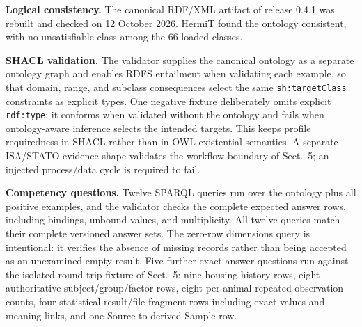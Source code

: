\textbf{Logical consistency.} The canonical RDF/XML artifact of release 0.4.1 was rebuilt and checked on 12 October 2026. HermiT \cite{hermit2014} found the ontology consistent, with no unsatisfiable class among the 66 loaded classes.

\textbf{SHACL validation.} The validator supplies the canonical ontology as a separate ontology graph and enables RDFS entailment when validating each example, so that domain, range, and subclass consequences select the same \nolinkurl{sh:targetClass} constraints as explicit types.  One negative fixture deliberately omits explicit \nolinkurl{rdf:type}: it conforms when validated without the ontology and fails when ontology-aware inference selects the intended targets. This keeps profile requiredness in SHACL rather than in OWL existential semantics. A separate ISA/STATO evidence shape validates the workflow boundary of Sect.~5; an injected process/data cycle is required to fail. 

\textbf{Competency questions.} Twelve SPARQL queries run over the ontology plus all positive examples, and the validator checks the complete expected answer rows, including bindings, unbound values, and multiplicity. All twelve queries match their complete versioned answer sets.  The zero-row dimensions query is intentional: it verifies the absence of missing records rather than being accepted as an unexamined empty result. Five further exact-answer questions run against the isolated round-trip fixture of Sect.~5: nine housing-history rows, eight authoritative subject/group/factor rows, eight per-animal repeated-observation counts, four statistical-result/file-fragment rows including exact values and meaning links, and one Source-to-derived-Sample row.

